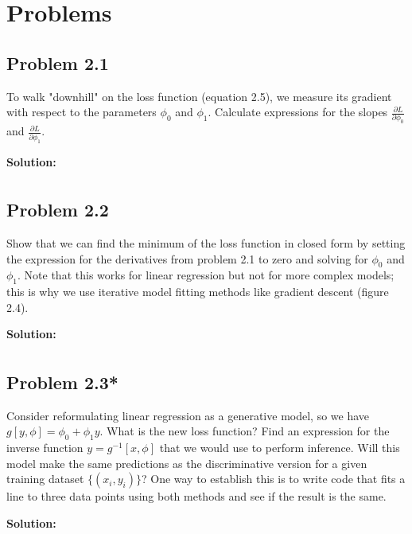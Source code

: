 \documentclass{article}
\begin{document}
\section*{Problems}

    \subsection*{Problem 2.1}
    To walk "downhill" on the loss function (equation 2.5), we measure its gradient with respect to the parameters $\phi_0$ and $\phi_1$. Calculate expressions for the slopes $\frac{\partial L}{\partial \phi_0}$ and $\frac{\partial L}{\partial \phi_1}$.

        \vspace{1cm}
        \textbf{Solution:}
        \begin{align*}
        \end{align*}

    \subsection*{Problem 2.2}
    Show that we can find the minimum of the loss function in closed form by setting the expression for the derivatives from problem 2.1 to zero and solving for $\phi_0$ and $\phi_1$. Note that this works for linear regression but not for more complex models; this is why we use iterative model fitting methods like gradient descent (figure 2.4).

        \vspace{1cm}
        \textbf{Solution:}
        \begin{align*}
        \end{align*}

    \subsection*{Problem 2.3*}
    Consider reformulating linear regression as a generative model, so we have $g[y, \phi] = \phi_0 + \phi_1 y$. What is the new loss function? Find an expression for the inverse function $y = g^{-1}[x, \phi]$ that we would use to perform inference. Will this model make the same predictions as the discriminative version for a given training dataset $\{(x_i, y_i)\}$? One way to establish this is to write code that fits a line to three data points using both methods and see if the result is the same.

        \vspace{1cm}
        \textbf{Solution:}
        \begin{align*}
        \end{align*}
\end{document}

